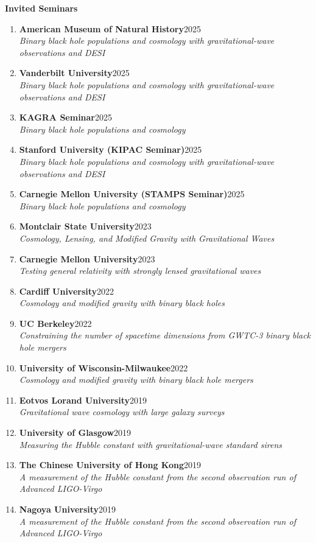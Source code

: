 \documentclass[letterpaper,10pt]{article}
\newcommand{\resheading}[1]{{\large \colorbox{mygrey}{\begin{minipage}{\dimexpr\textwidth-2\fboxsep\relax}{\textbf{#1 \vphantom{p\^{E}}}}\end{minipage}}}}
\newcommand{\presentation}[3]{%
\textbf{#1}\hfill #2\\
\textit{#3}}
\begin{document}
\resheading{Invited Seminars}
\begin{enumerate}
\item
	\presentation{American Museum of Natural History}{2025}{Binary black hole populations and cosmology with gravitational-wave observations and DESI
}
\item
	\presentation{Vanderbilt University}{2025}{Binary black hole populations and cosmology with gravitational-wave observations and DESI
}

\item
	\presentation{KAGRA Seminar}{2025}{Binary black hole populations and cosmology
}

\item
	\presentation{Stanford University (KIPAC Seminar)}{2025}{Binary black hole populations and cosmology with gravitational-wave observations and DESI
}

\item
	\presentation{Carnegie Mellon University (STAMPS Seminar)}{2025}{Binary black hole populations and cosmology
}

\item
	\presentation{Montclair State University}{2023}{Cosmology, Lensing, and Modified Gravity with Gravitational Waves
}
\item
	\presentation{Carnegie Mellon University}{2023}{Testing general relativity with strongly lensed gravitational waves 
}
\item
	\presentation{Cardiff University}{2022}{Cosmology and modified gravity with binary black holes}
\item
	\presentation{UC Berkeley}{2022}{Constraining the number of spacetime dimensions from GWTC-3 binary black hole mergers}
\item
	\presentation{University of Wisconsin-Milwaukee}{2022}{Cosmology and modified gravity with binary black hole mergers}  
\item
	\presentation{Eotvos Lorand University}{2019}{Gravitational wave cosmology with large galaxy surveys}     
\item
	\presentation{University of Glasgow}{2019}{Measuring the Hubble constant with gravitational-wave standard sirens}
\item
	\presentation{The Chinese University of Hong Kong}{2019}{A measurement of the Hubble constant from the second observation run of Advanced LIGO-Virgo}	
\item
	\presentation{Nagoya University}{2019}{A measurement of the Hubble constant from the second observation run of Advanced LIGO-Virgo}
\end{enumerate}
\end{document}
